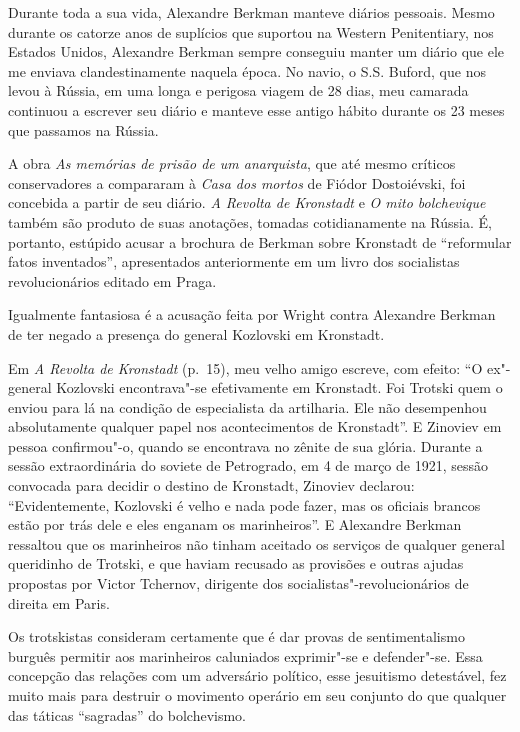 Durante toda a sua vida, Alexandre Berkman manteve diários pessoais.
Mesmo durante os catorze anos de suplícios que suportou na Western
Penitentiary, nos Estados Unidos, Alexandre Berkman sempre conseguiu
manter um diário que ele me enviava clandestinamente naquela época. No
navio, o S.S. Buford, que nos levou à Rússia, em uma longa e perigosa
viagem de 28 dias, meu camarada continuou a escrever seu diário e
manteve esse antigo hábito durante os 23 meses que passamos na Rússia.

A obra \textit{As memórias de prisão de um anarquista}, que até mesmo críticos
conservadores a compararam à \textit{Casa dos mortos} de Fiódor Dostoiévski, foi
concebida a partir de seu diário. \textit{A Revolta de Kronstadt} e \textit{O mito
bolchevique} também são produto de suas anotações, tomadas
cotidianamente na Rússia. É, portanto, estúpido acusar a brochura de
Berkman sobre Kronstadt de “reformular fatos inventados”, apresentados
anteriormente em um livro dos socialistas revolucionários editado em
Praga.

Igualmente fantasiosa é a acusação feita por Wright contra Alexandre
Berkman de ter negado a presença do general Kozlovski em Kronstadt.

Em \textit{A Revolta de Kronstadt} (p.~15), meu velho amigo escreve, com efeito:
“O ex"-general Kozlovski encontrava"-se efetivamente em Kronstadt.
Foi Trotski quem o enviou para lá na condição de especialista da
artilharia. Ele não desempenhou absolutamente qualquer papel nos
acontecimentos de Kronstadt”. E Zinoviev em pessoa confirmou"-o,
quando se encontrava no zênite de sua glória. Durante a sessão
extraordinária do soviete de Petrogrado, em 4 de março de 1921, sessão
convocada para decidir o destino de Kronstadt, Zinoviev declarou:
“Evidentemente, Kozlovski é velho e nada pode fazer, mas os oficiais
brancos estão por trás dele e eles enganam os marinheiros”. E Alexandre
Berkman ressaltou que os marinheiros não tinham aceitado os serviços de
qualquer general queridinho de Trotski, e que haviam recusado as
provisões e outras ajudas propostas por Victor Tchernov, dirigente
dos socialistas"-revolucionários de direita em Paris.

Os trotskistas consideram certamente que é dar provas de sentimentalismo
burguês permitir aos marinheiros caluniados exprimir"-se e
defender"-se. Essa concepção das relações com um adversário político,
esse jesuitismo detestável, fez muito mais para destruir o movimento
operário em seu conjunto do que qualquer das táticas “sagradas” do
bolchevismo.

